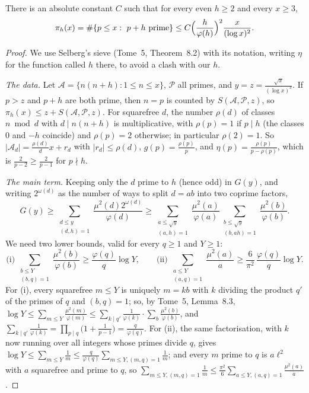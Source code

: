 \begin{proposition}\label{prop:pairs}
There is an absolute constant $C$ such that for every even $h\ge2$ and every $x\ge3$,
\[
\pi_h(x)=\#\{p\le x:\ p+h\text{ prime}\}\le C\Bigl(\frac h{\varphi(h)}\Bigr)^2\frac x{(\log x)^2}.
\]
\end{proposition}
\begin{proof}
We use Selberg's sieve (Tome~5, Theorem~8.2) with its notation, writing $\eta$ for the function called $h$ there, to avoid a clash with our $h$.

\emph{The data.} Let $\mathcal A=\{n(n+h):1\le n\le x\}$, $\mathcal P$ all primes, and $y=z=\frac{\sqrt x}{(\log x)^3}$. If $p>z$ and $p+h$ are both prime, then
$n=p$ is counted by $S(\mathcal A,\mathcal P,z)$, so $\pi_h(x)\le z+S(\mathcal A,\mathcal P,z)$. For squarefree $d$, the number $\rho(d)$ of classes $n\bmod d$ with
$d\mid n(n+h)$ is multiplicative, with $\rho(p)=1$ if $p\mid h$ (the classes $0$ and $-h$ coincide) and $\rho(p)=2$ otherwise; in particular $\rho(2)=1$. So
$|\mathcal A_d|=\frac{\rho(d)}dx+r_d$ with $|r_d|\le\rho(d)$, $g(p)=\frac{\rho(p)}p$, and $\eta(p)=\frac{\rho(p)}{p-\rho(p)}$, which is $\frac2{p-2}\ge\frac2{p-1}$ for
$p\nmid h$.

\emph{The main term.} Keeping only the $d$ prime to $h$ (hence odd) in $G(y)$, and writing $2^{\omega(d)}$ as the number of ways to split $d=ab$ into
two coprime factors,
\[
G(y)\ge\sum_{\substack{d\le y\\(d,h)=1}}\frac{\mu^2(d)2^{\omega(d)}}{\varphi(d)}\ge\sum_{\substack{a\le\sqrt y\\(a,h)=1}}\frac{\mu^2(a)}{\varphi(a)}\sum_{\substack{b\le\sqrt y\\(b,ah)=1}}\frac{\mu^2(b)}{\varphi(b)}.
\]
We need two lower bounds, valid for every $q\ge1$ and $Y\ge1$:
\[
\text{(i)}\ \sum_{\substack{b\le Y\\(b,q)=1}}\frac{\mu^2(b)}{\varphi(b)}\ge\frac{\varphi(q)}q\log Y,\qquad\text{(ii)}\ \sum_{\substack{a\le Y\\(a,q)=1}}\frac{\mu^2(a)}a\ge\frac6{\pi^2}\,\frac{\varphi(q)}q\log Y.
\]
For (i), every squarefree $m\le Y$ is uniquely $m=kb$ with $k$ dividing the product $q'$ of the primes of $q$ and $(b,q)=1$; so, by Tome~5, Lemma~8.3,
$\log Y\le\sum_{m\le Y}\frac{\mu^2(m)}{\varphi(m)}\le\sum_{k\mid q'}\frac1{\varphi(k)}\cdot\sum_{b}\frac{\mu^2(b)}{\varphi(b)}$, and
$\sum_{k\mid q'}\frac1{\varphi(k)}=\prod_{p\mid q}\bigl(1+\frac1{p-1}\bigr)=\frac q{\varphi(q)}$. For (ii), the same factorisation, with $k$ now running over all
integers whose primes divide $q$, gives $\log Y\le\sum_{m\le Y}\frac1m\le\frac q{\varphi(q)}\sum_{m\le Y,(m,q)=1}\frac1m$; and every $m$ prime to $q$ is $a\ell^2$ with $a$
squarefree and prime to $q$, so $\sum_{m\le Y,(m,q)=1}\frac1m\le\frac{\pi^2}6\sum_{a\le Y,(a,q)=1}\frac{\mu^2(a)}a$.


\end{proof}
